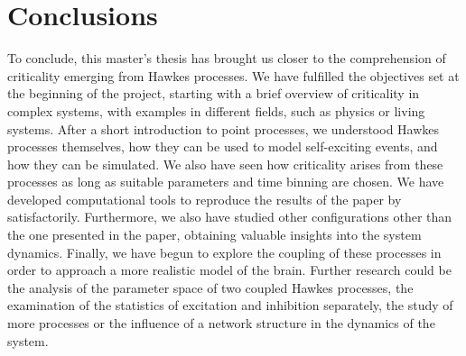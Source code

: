 \chapter{Conclusions}\label{ch:conclusiones}

To conclude, this master's thesis has brought us closer to the comprehension of criticality emerging from Hawkes processes. We have fulfilled the objectives set at the beginning of the project, 
starting with a brief overview of criticality in complex systems, with examples in different fields, such as physics or living systems. After a short introduction to point processes,
we understood Hawkes processes themselves, how they can be used to model self-exciting events, and how they can be simulated. We also have seen how criticality arises from 
these processes as long as suitable parameters and time binning are chosen. We have developed computational tools to reproduce the results of the paper by \cite{notarmuzi2021percolation} 
satisfactorily. Furthermore, we also have studied other configurations other than the one presented in the paper, obtaining valuable insights into the system dynamics. Finally, we have 
begun to explore the coupling of these processes in order to approach a more realistic model of the brain. Further research could be the analysis of the parameter space of two coupled
Hawkes processes, the examination of the statistics of excitation and inhibition separately, the study of more processes or the influence of a network structure in the dynamics of the system.  
